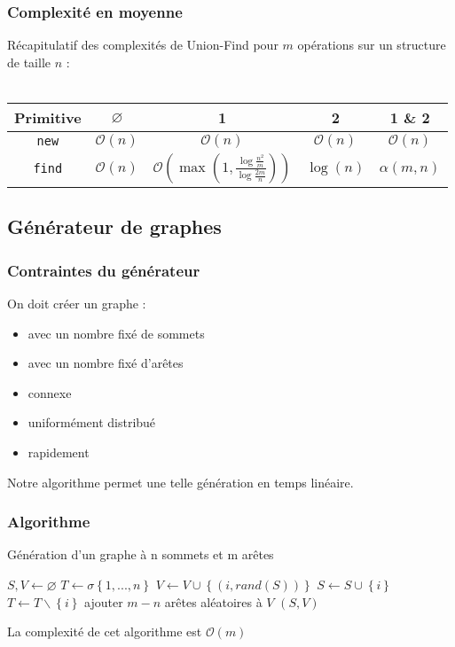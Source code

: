 \documentclass{beamer}
\begin{document}
			\begin{frame}
				\frametitle{Complexité en moyenne}

				Récapitulatif des complexités de Union-Find pour $m$
				opérations sur un structure de taille $n$ :
				\\~\\
				\begin{tabular}{|c|c|c|c|c|}
					\hline
					Primitive & $\varnothing$ & 1 & 2 & 1 \& 2
					\\
					\hline
					\texttt{new} & $\mathcal{O}(n)$ & $\mathcal{O}(n)$
					& $\mathcal{O}(n)$ & $\mathcal{O}(n)$
					\\
					\hline
					\texttt{find} & $\mathcal{O}(n)$ &
					$\mathcal{O}(\max(1,\frac
						{\log\frac{n^{2}}{m}}
						{\log\frac{2m}{n}}))$ &
					$\log(n)$ & $\alpha(m,n)$ 
					\\
					\hline
				\end{tabular}

			\end{frame}
		\subsection{Générateur de graphes}
			\begin{frame}
				\frametitle{Contraintes du générateur}
				On doit créer un graphe :
				\begin{itemize}
					\item avec un nombre fixé de sommets \pause
					\item avec un nombre fixé d'arêtes \pause
					\item connexe \pause
					\item uniformément distribué \pause
					\item rapidement \pause
				\end{itemize}
				Notre algorithme permet une telle génération en temps linéaire.
			\end{frame}
			\begin{frame}
				\frametitle{Algorithme}
				
				\begin{algorithm}[H]
					\caption{Génération d'un graphe à n sommets
					et m arêtes}
					\begin{algorithmic}[H]
						\STATE $S,V \leftarrow \varnothing$
						\STATE $T \leftarrow \sigma\left\{1,...,n\right\}$
						\FOR {$i \in T$}
						\STATE $V \leftarrow V\cup\left\{(i,rand(S))\right\}$
						\STATE $S \leftarrow S\cup\left\{i\right\}$
						\STATE $T \leftarrow T\backslash\left\{i\right\}$
						\ENDFOR
						\STATE ajouter $m-n$ arêtes aléatoires à $V$
						\RETURN $(S,V)$
					\end{algorithmic}
				\end{algorithm}
				\pause
				La complexité de cet algorithme est $\mathcal{O}(m)$
			\end{frame}
\end{document}
